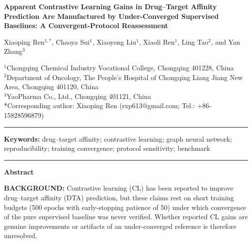 \documentclass[10pt,a4paper,twocolumn]{article}
\begin{document}
\pagestyle{myheadings}

\begin{center}
{\LARGE\bfseries Apparent Contrastive Learning Gains in Drug--Target Affinity Prediction Are Manufactured by Under-Converged Supervised Baselines: A Convergent-Protocol Reassessment}

\vspace{1em}

{\large Xiaoping Ren$^{1,*}$, Chaoya Sui$^{1}$, Xiaoyong Liu$^{1}$, Xiaoli Ren$^{1}$, Ling Tao$^{2}$, and Yan Zhang$^{3}$}

\vspace{0.5em}

\small
$^{1}$Chongqing Chemical Industry Vocational College, Chongqing 401228, China\\
$^{2}$Department of Oncology, The People's Hospital of Chongqing Liang Jiang New Area, Chongqing 401120, China\\
$^{3}$YaoPharma Co., Ltd., Chongqing 401121, China\\

\vspace{0.5em}
*Corresponding author: Xiaoping Ren (rxp613@gmail.com; Tel.: +86-15828596879)
\end{center}

\noindent\rule{\linewidth}{1pt}

\textbf{Keywords:} drug--target affinity; contrastive learning; graph neural network; reproducibility; training convergence; protocol sensitivity; benchmark

\noindent\rule{\linewidth}{1pt}

\vspace{1em}
\noindent\textbf{Abstract}

\noindent\textbf{BACKGROUND:} Contrastive learning (CL) has been reported to improve drug--target affinity (DTA) prediction, but these claims rest on short training budgets (500 epochs with early-stopping patience of 50) under which convergence of the pure supervised baseline was never verified. Whether reported CL gains are genuine improvements or artifacts of an under-converged reference is therefore unresolved.
\end{document}
